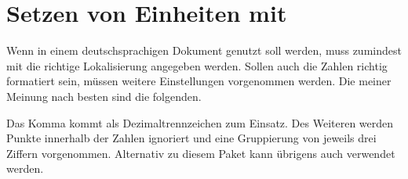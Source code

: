 \section{Setzen von Einheiten mit }
\label{sec:tips:siunitx}
Wenn  in einem deutschsprachigen Dokument genutzt soll
werden, muss zumindest mit  die 
richtige Lokalisierung angegeben werden. Sollen auch die Zahlen richtig 
formatiert sein, müssen weitere Einstellungen vorgenommen werden. Die meiner 
Meinung nach besten sind die folgenden.
%
\begin{quoting}
\begin{Code}
\end{Code}
\end{quoting}
%
Das Komma kommt als Dezimaltrennzeichen zum Einsatz. Des Weiteren werden Punkte 
innerhalb der Zahlen ignoriert und eine Gruppierung von jeweils drei Ziffern 
vorgenommen. Alternativ zu diesem Paket kann übrigens auch  
verwendet werden.




